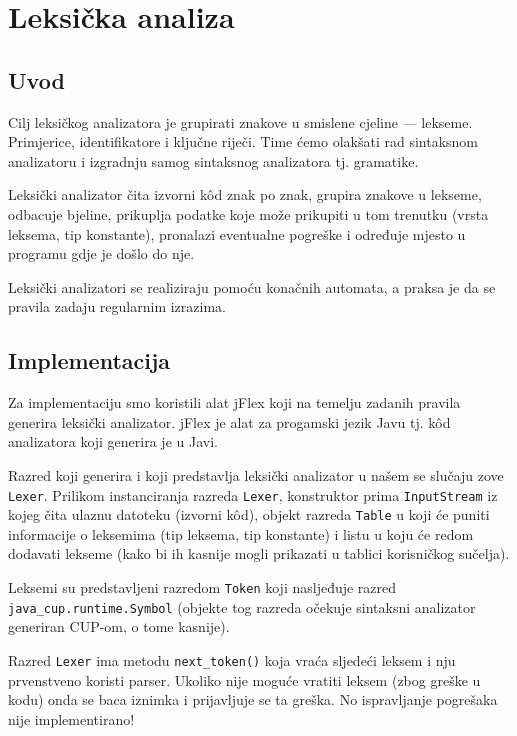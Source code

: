 \chapter{Leksička analiza}

\section{Uvod}
Cilj leksičkog analizatora je grupirati znakove u smislene cjeline --- lekseme. Primjerice, identifikatore i ključne riječi.
Time ćemo olakšati rad sintaksnom analizatoru i izgradnju samog sintaksnog analizatora tj. gramatike.

Leksički analizator čita izvorni kôd znak po znak, grupira znakove u lekseme, odbacuje bjeline, prikuplja podatke koje može prikupiti u tom trenutku (vrsta leksema, tip konstante), pronalazi eventualne pogreške i određuje mjesto u programu gdje je došlo do nje.

Leksički analizatori se realiziraju pomoću konačnih automata, a praksa je da se pravila zadaju regularnim izrazima.

\section{Implementacija}

Za implementaciju smo koristili alat jFlex koji na temelju zadanih pravila generira leksički analizator. jFlex je
alat za progamski jezik Javu tj. kôd analizatora koji generira je u Javi.

Razred koji generira i koji predstavlja leksički analizator u našem se slučaju zove \texttt{Lexer}. Prilikom
instanciranja razreda \texttt{Lexer}, konstruktor prima \texttt{InputStream} iz kojeg čita ulaznu datoteku (izvorni kôd),
objekt razreda \texttt{Table} u koji će puniti informacije o leksemima (tip leksema, tip konstante) i listu u koju će
redom dodavati lekseme (kako bi ih kasnije mogli prikazati u tablici korisničkog sučelja).

Leksemi su predstavljeni razredom \texttt{Token} koji nasljeđuje razred \texttt{java\_cup.runtime.Symbol} (objekte tog razreda
očekuje sintaksni analizator generiran CUP-om, o tome kasnije). 

Razred \texttt{Lexer} ima metodu \texttt{next\_token()} koja vraća sljedeći leksem i nju prvenstveno koristi parser. Ukoliko
nije moguće vratiti leksem (zbog greške u kodu) onda se baca iznimka i prijavljuje se ta greška. 
No ispravljanje pogrešaka nije implementirano!


